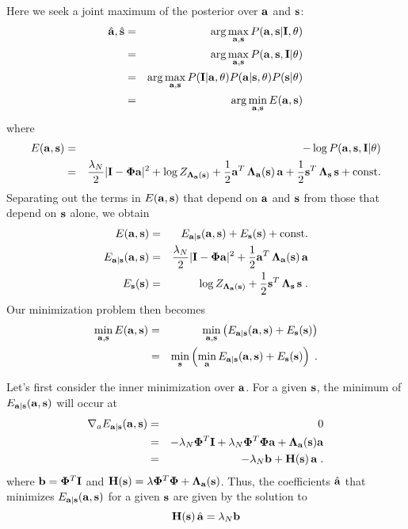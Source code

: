 \documentclass[12pt]{article}
\newcommand{\params}{\theta}
\newcommand{\ba}{{\bf a}}
\newcommand{\bah}{\hat{\bf a}}
\newcommand{\bs}{{\bf s}}
\newcommand{\bsh}{\hat{\bf s}}
\newcommand{\bI}{{\bf I}}
\newcommand{\bPhi}{{\bf \Phi}}
\newcommand{\bLambdas}{{\bf \Lambda_s}}
\newcommand{\bLambdaa}{{\bf \Lambda_a}}
\newcommand{\bb}{{\bf b}}
\newcommand{\bH}{{\bf H}}
\begin{document}
Here we seek a joint maximum of the posterior over $\ba$ and $\bs$:
\begin{eqnarray}
\bah,\bsh & = & \arg\max_{\ba,\bs} P(\ba,\bs|\bI,\params) \\
 & = & \arg\max_{\ba,\bs} P(\ba,\bs,\bI|\params) \\
 & = & \arg\max_{\ba,\bs} P(\bI|\ba,\params) P(\ba|\bs,\params)
                            P(\bs|\params) \\
 & = & \arg\min_{\ba,\bs} E(\ba,\bs)
\end{eqnarray}
where
\begin{eqnarray}
E(\ba,\bs) & = & -\log P(\ba,\bs,\bI|\params) \\
  & = & \frac{\lambda_N}{2}|\bI-\bPhi \ba|^2 
        + \log Z_{\bLambdaa(\bs)} + \frac{1}{2} \ba^T \, \bLambdaa(\bs)\, \ba
        + \frac{1}{2} \bs^T \, \bLambdas\, \bs  + \mbox{const.}
\label{eq:log-posterior-terms}
\end{eqnarray}
Separating out the terms in $E(\ba,\bs)$ that depend on
$\ba$ and $\bs$ from those that depend on $\bs$ alone, we obtain
\begin{eqnarray}
E(\ba,\bs) & = & E_{\ba|\bs}(\ba,\bs) + E_{\bs}(\bs) + \mbox{const.} \\
E_{\ba|\bs}(\ba,\bs) & = & \frac{\lambda_N}{2}|\bI-\bPhi \ba|^2 + 
                          \frac{1}{2} \ba^T \, \bLambdaa(\bs)\, \ba  \\
E_{\bs}(\bs) & = &  \log Z_{\bLambdaa(\bs)}
                    + \frac{1}{2} \bs^T \, \bLambdas\, \bs  \; .
\end{eqnarray}
Our minimization problem then becomes
\begin{eqnarray}
\min_{\ba,\bs} E(\ba,\bs) & = & 
  \min_{\ba,\bs}  \left(E_{\ba|\bs}(\ba,\bs) + E_{\bs}(\bs) \right) \\
 & = & \min_{\bs} 
         \left( \min_{\ba} E_{\ba|\bs}(\ba,\bs) + E_{\bs}(\bs) \right)  \; .
\end{eqnarray}

Let's first consider the inner minimization over $\ba$.  For a given
$\bs$, the minimum of $E_{\ba|\bs}(\ba,\bs)$ will occur at
\begin{eqnarray}
\nabla_a E_{\ba|\bs}(\ba,\bs) & = & 0 \\
 & = & -\lambda_N \bPhi^T \bI + \lambda_N \bPhi^T\bPhi\ba + \bLambdaa(\bs)\ba \\
 & = & -\lambda_N \bb + \bH(\bs)\,\ba \; .
\end{eqnarray}
where $\bb=\bPhi^T\bI$ and $\bH(\bs)=\lambda\bPhi^T\bPhi +
\bLambdaa(\bs)$.  Thus, the coefficients $\bah$ that minimizes
$E_{\ba|\bs}(\ba,\bs)$ for a given $\bs$ are given by the solution to
\begin{equation}
\bH(\bs)\, \bah = \lambda_N \bb
\end{equation}
\end{document}
